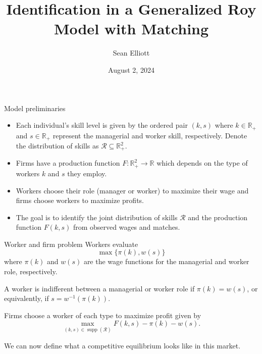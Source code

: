\documentclass{beamer}
\title[Identification in a Generalized Roy Model with Matching]{Identification in a Generalized Roy Model with Matching}
\date{August 2, 2024}
\author{Sean Elliott}
\institute{University of Toronto}
\DeclareMathOperator\supp{supp}
\begin{document}
	
	
	
%	

	\begin{frame}{Model preliminaries}
		
		\begin{itemize}
			\item Each individual's skill level is given by the ordered pair $(k,s)$ where $k\in\mathbb{R}_+$ and $s\in\mathbb{R}_+$ represent the managerial and worker skill, respectively. Denote the distribution of skills as $\mathcal{R}\subseteq \mathbb{R}^2_+$.
			
			\bigskip
			
			\item Firms have a production function $F:\mathbb{R}^2_+ \to \mathbb{R}$ which depends on the type of workers $k$ and $s$ they employ.
			
			\bigskip
			
			\item Workers choose their role (manager or worker) to maximize their wage and firms choose workers to maximize profits.
			
			\bigskip
			
			\item The goal is to identify the joint distribution of skills $\mathcal{R}$ and the production function $F(k,s)$ from observed wages and matches.

		\end{itemize}
		

	\end{frame}

	\begin{frame}{Worker and firm problem}
		Workers evaluate 
		\begin{equation*}
			\max\{\pi(k),w(s)\}
		\end{equation*}
		where $\pi(k)$ and $w(s)$ are the wage functions for the managerial and worker role, respectively.

	\bigskip
	
	A worker is indifferent between a managerial or worker role if $\pi(k) = w(s)$, or equivalently, if $s=w^{-1}(\pi(k))$.
	
	\bigskip
	
	Firms choose a worker of each type to maximize profit given by
	\begin{equation*}
		\max_{(k,s)\in\supp(\mathcal{R})} F(k,s) - \pi(k) - w(s).
	\end{equation*}
	
	\bigskip
	
	We can now define what a competitive equilibrium looks like in this market.
	
		\end{frame}
		
\end{document}
